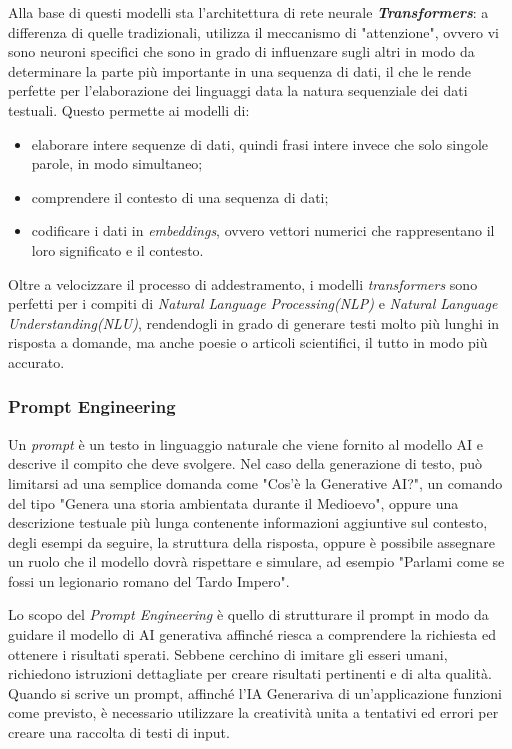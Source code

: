 Alla base di questi modelli sta l'architettura di rete neurale \textbf{\textit{Transformers}}: a differenza di quelle tradizionali, utilizza il meccanismo di "attenzione", ovvero vi sono neuroni specifici che sono in grado di influenzare sugli altri in modo da determinare la parte più importante in una sequenza di dati, il che le rende perfette per l'elaborazione dei linguaggi data la natura sequenziale dei dati testuali. 
Questo permette ai modelli di:
\begin{itemize}
    \item elaborare intere sequenze di dati, quindi frasi intere invece che solo singole parole, in modo simultaneo;
    \item comprendere il contesto di una sequenza di dati;
    \item codificare i dati in \textit{embeddings}, ovvero vettori numerici che rappresentano il loro significato e il contesto.
\end{itemize}
Oltre a velocizzare il processo di addestramento, i modelli \textit{transformers} sono perfetti per i compiti di \textit{Natural Language Processing(NLP)} e \textit{Natural Language Understanding(NLU)}, rendendogli in grado di generare testi molto più lunghi in risposta a domande, ma anche poesie o articoli scientifici, il tutto in modo più accurato. 

\subsubsection{Prompt Engineering}
Un \textit{prompt} è un testo in linguaggio naturale che viene fornito al modello AI e descrive il compito che deve svolgere.
Nel caso della generazione di testo, può limitarsi ad una semplice domanda come "Cos'è la Generative AI?", un comando del tipo "Genera una storia ambientata durante il Medioevo", oppure una descrizione testuale più lunga contenente informazioni aggiuntive sul contesto, degli esempi da seguire, la struttura della risposta, oppure è possibile assegnare un ruolo che il modello dovrà rispettare e simulare, ad esempio "Parlami come se fossi un legionario romano del Tardo Impero".

Lo scopo del \textit{Prompt Engineering} è quello di strutturare il prompt in modo da guidare il modello di AI generativa affinché riesca a comprendere la richiesta ed ottenere i risultati sperati. Sebbene cerchino di imitare gli esseri umani, richiedono istruzioni dettagliate per creare risultati pertinenti e di alta qualità. Quando si scrive un prompt, affinché l'IA Generariva di un'applicazione funzioni come previsto, è necessario utilizzare la creatività unita a tentativi ed errori per creare una raccolta di testi di input.

